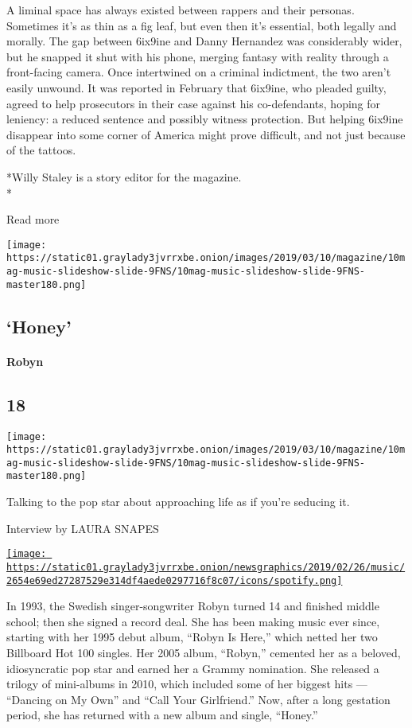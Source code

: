 A liminal space has always existed between rappers and their personas.
Sometimes it's as thin as a fig leaf, but even then it's essential, both
legally and morally. The gap between 6ix9ine and Danny Hernandez was
considerably wider, but he snapped it shut with his phone, merging
fantasy with reality through a front-facing camera. Once intertwined on
a criminal indictment, the two aren't easily unwound. It was reported in
February that 6ix9ine, who pleaded guilty, agreed to help prosecutors in
their case against his co-defendants, hoping for leniency: a reduced
sentence and possibly witness protection. But helping 6ix9ine disappear
into some corner of America might prove difficult, and not just because
of the tattoos.

*Willy Staley is a story editor for the magazine.\\
*

Read more

\texttt{[image: https://static01.graylady3jvrrxbe.onion/images/2019/03/10/magazine/10mag-music-slideshow-slide-9FNS/10mag-music-slideshow-slide-9FNS-master180.png]}

\hypertarget{--honey}{%
\subsection{\texorpdfstring{ `Honey'}{  `Honey'}}\label{--honey}}

\hypertarget{robyn}{%
\paragraph{Robyn}\label{robyn}}

\hypertarget{18}{%
\subsection{18}\label{18}}

\texttt{[image: https://static01.graylady3jvrrxbe.onion/images/2019/03/10/magazine/10mag-music-slideshow-slide-9FNS/10mag-music-slideshow-slide-9FNS-master180.png]}

Talking to the pop star about approaching life as if you're seducing it.

Interview by LAURA SNAPES

\href{https://open.spotify.com/track/3olYZQTYOLYNImERBnZZqm}{\texttt{[image: https://static01.graylady3jvrrxbe.onion/newsgraphics/2019/02/26/music/2654e69ed27287529e314df4aede0297716f8c07/icons/spotify.png]}}

In 1993, the Swedish singer-songwriter Robyn turned 14 and finished
middle school; then she signed a record deal. She has been making music
ever since, starting with her 1995 debut album, ``Robyn Is Here,'' which
netted her two Billboard Hot 100 singles. Her 2005 album, ``Robyn,''
cemented her as a beloved, idiosyncratic pop star and earned her a
Grammy nomination. She released a trilogy of mini-albums in 2010, which
included some of her biggest hits --- ``Dancing on My Own'' and ``Call
Your Girlfriend.'' Now, after a long gestation period, she has returned
with a new album and single, ``Honey.''

